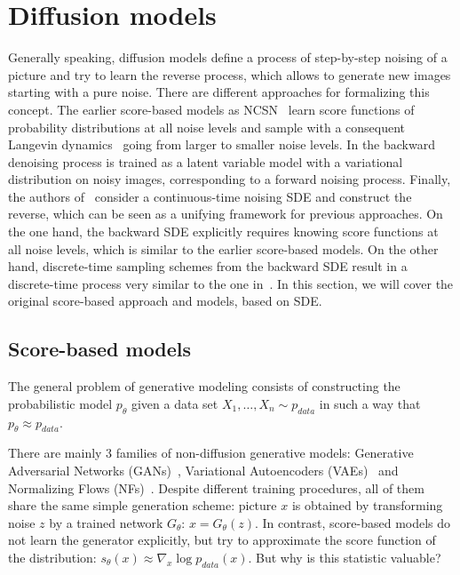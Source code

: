 \section{Diffusion models} Generally speaking, diffusion models define a process of step-by-step noising of a picture and try to learn the reverse process, which allows to generate new images starting with a pure noise. There are different approaches for formalizing this concept. The earlier score-based models as NCSN~\cite{song2019generative} learn score functions of probability distributions at all noise levels and sample with a consequent Langevin dynamics~\cite{welling2011bayesian} going from larger to smaller noise levels. In \cite{ho2020denoising} the backward denoising process is trained as a latent variable model with a variational distribution on noisy images, corresponding to a forward noising process. Finally, the authors of~\cite{song2020score} consider a continuous-time noising SDE and construct the reverse, which can be seen as a unifying framework for previous approaches. On the one hand, the backward SDE explicitly requires knowing score functions at all noise levels, which is similar to the earlier score-based models. On the other hand, discrete-time sampling schemes from the backward SDE result in a discrete-time process very similar to the one in~\cite{ho2020denoising}. In this section, we will cover the original score-based approach and models, based on SDE.

\subsection{Score-based models}
The general problem of generative modeling consists of constructing the probabilistic model $p_\theta$ given a data set $X_1, \ldots, X_n \sim p_{data}$ in such a way that $p_\theta \approx p_{data}$. 

There are mainly 3 families of non-diffusion generative models: Generative Adversarial Networks  (GANs)~\cite{goodfellow2014generative}, Variational Autoencoders (VAEs)~\cite{kingma2013auto} and Normalizing Flows (NFs)~\cite{dinh2014nice,rezende2015variational}. Despite different training procedures, all of them share the same simple generation scheme: picture $x$ is obtained by transforming noise $z$ by a trained network $G_\theta$: $x = G_\theta(z)$. In contrast, score-based models do not learn the generator explicitly, but try to approximate the score function of the distribution: $s_\theta(x) \approx \nabla_{x} \log p_{data}(x)$. But why is this statistic valuable?

